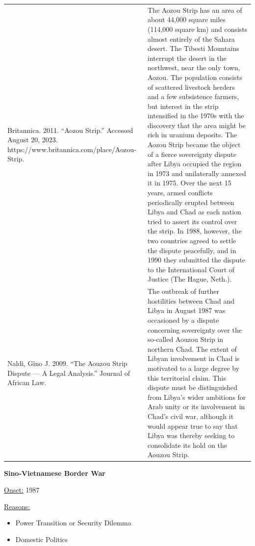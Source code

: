 {\begin{longtable}{p{}p{}}
Britannica. 2011. “Aozou Strip.” Accessed August 20, 2023. https://www.britannica.com/place/Aozou-Strip. & The Aozou Strip has an area of about 44,000 square miles (114,000 square km) and consists almost entirely of the Sahara desert. The Tibesti Mountains interrupt the desert in the northwest, near the only town, Aozou. The population consists of scattered livestock herders and a few subsistence farmers, but interest in the strip intensified in the 1970s with the discovery that the area might be rich in uranium deposits. The Aozou Strip became the object of a fierce sovereignty dispute after Libya occupied the region in 1973 and unilaterally annexed it in 1975. Over the next 15 years, armed conflicts periodically erupted between Libya and Chad as each nation tried to assert its control over the strip. In 1988, however, the two countries agreed to settle the dispute peacefully, and in 1990 they submitted the dispute to the International Court of Justice (The Hague, Neth.).
\\
Naldi, Gino J. 2009. “The Aouzou Strip Dispute — A Legal Analysis.” Journal of African Law. & The outbreak of further hostilities between Chad and Libya in August 1987 was occasioned by a dispute concerning sovereignty over the so-called Aouzou Strip in northern Chad. The extent of Libyan involvement in Chad is motivated to a large degree by this territorial claim. This dispute must be distinguished from Libya's wider ambitions for Arab unity or its involvement in Chad's civil war, although it would appear true to say that Libya was thereby seeking to consolidate its hold on the Aouzou Strip.
\\
\end{longtable}}
\clearpage
         \textbf{Sino-Vietnamese Border War} 

          \underline{Onset:} 1987         

\underline{Reasons:}
\begin{itemize}
\item Power Transition or Security Dilemma
\item Domestic Politics
\end{itemize}

